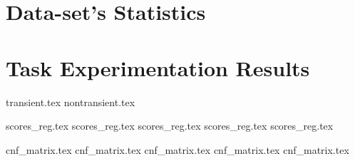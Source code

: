 \section{Data-set's Statistics}
\section{Task Experimentation Results}

\newpage
\pagebreak

{transient.tex}
{nontransient.tex}

{scores_reg.tex}
{scores_reg.tex}
{scores_reg.tex}
{scores_reg.tex}
{scores_reg.tex}

{cnf_matrix.tex}
{cnf_matrix.tex}
{cnf_matrix.tex}
{cnf_matrix.tex}
{cnf_matrix.tex}